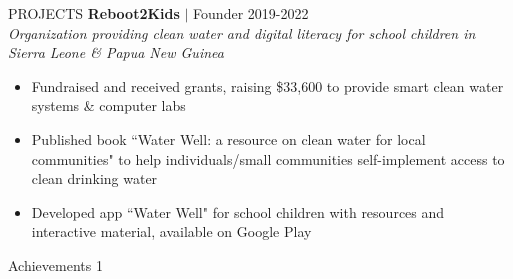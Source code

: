 \documentclass{resume} %
\begin{document}
\begin{rSection}{PROJECTS}
{ \textbf{Reboot2Kids} $\vert$ Founder} \hfill 2019-2022\\ 
\textit{Organization providing clean water and digital literacy for school children in Sierra Leone \& Papua New Guinea}
\vspace{-0.6em}
\begin{itemize}
\item Fundraised and received grants, raising \$33,600 to provide smart clean water systems \& computer labs
\vspace{-0.4em}
\item Published book ``Water Well: a resource on clean water for local communities" to help individuals/small communities self-implement access to clean drinking water
\vspace{-0.4em}
\item Developed app ``Water Well" for school children with resources and interactive material, available on Google Play
\end{itemize}

\end{rSection}

\vspace{-0.2em}

\begin{rSection}{Achievements}
{1}\\ 
\end{rSection}

\end{document}
